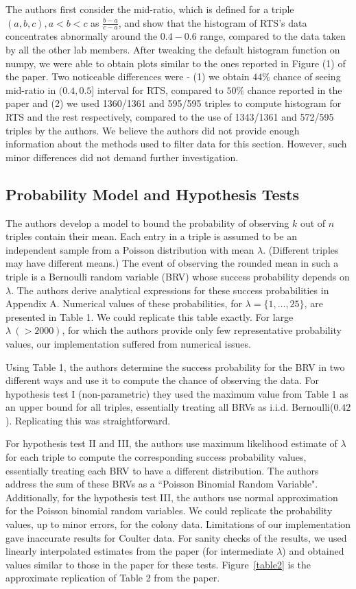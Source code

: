 \documentclass{article}
\begin{document}
The authors first consider the mid-ratio, which is defined for a triple \((a, b, c), a<b<c\) as
\(\frac{b-a}{c-a}\), and show that the histogram of RTS's data concentrates
abnormally around the \(0.4-0.6\) range, compared to the data taken by all the other lab members.
After tweaking the default histogram function on numpy, we were able to obtain plots similar to the ones reported in Figure (1) of the paper. Two noticeable differences were - (1) we obtain $44\%$ chance of seeing mid-ratio in $(0.4, 0.5]$ interval for RTS, compared to $50\%$ chance reported in the paper and (2) we used 1360/1361 and 595/595 triples to compute histogram for RTS and the rest respectively, compared to the use of 1343/1361 and 572/595 triples by the authors.
We believe the authors did not provide enough information about the methods used to filter data for this section. However, such minor differences did not demand further investigation.

    \subsection{Probability Model and Hypothesis Tests}\label{probability-model}

The authors develop a model to bound the probability of observing $k$ out of $n$ triples contain their mean.
Each entry in a triple is assumed to be an independent sample from a Poisson distribution with mean $\lambda$. (Different triples may have different means.)
The event of observing the rounded mean in such a triple is a Bernoulli random variable (BRV) whose success probability depends on $\lambda$.
The authors derive analytical expressions for these success probabilities in Appendix A.
Numerical values of these probabilities, for $\lambda=\{1, \ldots, 25\}$, are presented in Table 1.
We could replicate this table exactly.
For large $\lambda\ (>2000)$, for which the authors provide only few representative probability values, our implementation suffered from numerical issues.

Using Table 1, the authors determine the success probability for the BRV in two different ways and use it to compute the chance of observing the data.  For hypothesis test I (non-parametric) they used the maximum value from Table 1 as an upper bound for all triples, essentially treating all BRVs as i.i.d. Bernoulli($0.42$). Replicating this was straightforward.

For hypothesis test II and III, the authors use maximum likelihood estimate of $\lambda$ for each triple to compute the corresponding success probability values, essentially treating each BRV to have a different distribution. The authors address the sum of these BRVs as a ``Poisson Binomial Random Variable".
Additionally, for the hypothesis test III, the authors use normal approximation for the Poisson binomial random variables. 
We could replicate the probability values, up to minor errors, for the colony data. 
Limitations of our implementation gave inaccurate results for Coulter data. 
For sanity checks of the results, we used linearly interpolated estimates from the paper (for intermediate $\lambda$) and obtained values similar to those in the paper for these tests. Figure~\ref{table2} is the approximate replication of Table 2 from the paper.
\end{document}
